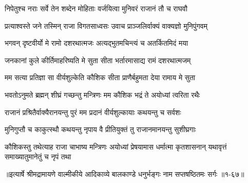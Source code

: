 \twolineshloka
{निपेतुश्च नराः सर्वे तेन शब्देन मोहिताः}
{वर्जयित्वा मुनिवरं राजानं तौ च राघवौ} %

\twolineshloka
{प्रत्याश्वस्ते जने तस्मिन् राजा विगतसाध्वसः}
{उवाच प्राञ्जलिर्वाक्यं वाक्यज्ञो मुनिपुंगवम्} %

\twolineshloka
{भगवन् दृष्टवीर्यो मे रामो दशरथात्मजः}
{अत्यद्भुतमचिन्त्यं च अतर्कितमिदं मया} %

\twolineshloka
{जनकानां कुले कीर्तिमाहरिष्यति मे सुता}
{सीता भर्तारमासाद्य रामं दशरथात्मजम्} %

\twolineshloka
{मम सत्या प्रतिज्ञा सा वीर्यशुल्केति कौशिक}
{सीता प्राणैर्बहुमता देया रामाय मे सुता} %

\twolineshloka
{भवतोऽनुमते ब्रह्मन् शीघ्रं गच्छन्तु मन्त्रिणः}
{मम कौशिक भद्रं ते अयोध्यां त्वरिता रथैः} %

\twolineshloka
{राजानं प्रश्रितैर्वाक्यैरानयन्तु पुरं मम}
{प्रदानं वीर्यशुल्कायाः कथयन्तु च सर्वशः} %

\twolineshloka
{मुनिगुप्तौ च काकुत्स्थौ कथयन्तु नृपाय वै}
{प्रीतियुक्तं तु राजानमानयन्तु सुशीघ्रगाः} %

\threelineshloka
{कौशिकस्तु तथेत्याह राजा चाभाष्य मन्त्रिणः}
{अयोध्यां प्रेषयामास धर्मात्मा कृतशासनान्}
{यथावृत्तं समाख्यातुमानेतुं च नृपं तथा} %


॥इत्यार्षे श्रीमद्रामायणे वाल्मीकीये आदिकाव्ये बालकाण्डे धनुर्भङ्गः नाम सप्तषष्ठितमः सर्गः ॥१-६७॥
